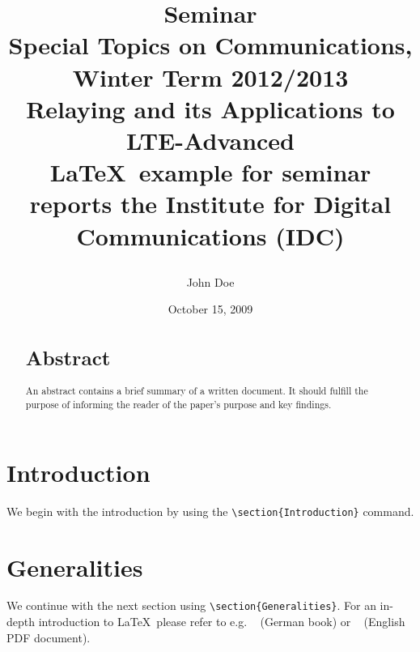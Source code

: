 \documentclass[12pt,a4paper,notitlepage,twoside,headsepline]{scrartcl}
\begin{document}
\begin{titlepage}
\title{
\begin{center}
    {\Large\bfseries Seminar}   \\                
    {\large Special Topics on Communications, Winter Term 2012/2013}   \\[0.5cm]
    {\LARGE\bfseries Relaying and its Applications to LTE-Advanced}   \\[0.3cm] 
    \LaTeX\ example for seminar reports the Institute for Digital Communications (IDC)
\end{center}
}
\author{John Doe}
\date{October 15, 2009}
\end{titlepage}

\maketitle

\begin{abstract}
\section*{Abstract}
An abstract contains a brief summary of a written document. It should fulfill the purpose of informing the reader of the paper's purpose and key findings.
\end{abstract}

\section{Introduction}

We begin with the introduction by using the 
\verb|\section{Introduction}| command.


\section{Generalities}

We continue with the next section using \verb|\section{Generalities}|. For an in-depth introduction to \LaTeX\ please refer to e.g. ~\cite{Kopka:1} (German book) or ~\cite{IntroLateX:08} (English PDF document).
\end{document}
